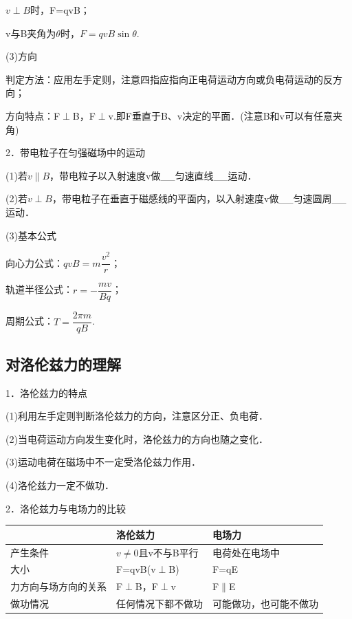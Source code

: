 \documentclass[cn,10.5pt,chinese,mac,chinesefont=founder]{elegantbook}
\begin{document}
$v\perp B$时，F=qvB；

v与B夹角为$\theta$时，$F=qvB\sin \theta$.

(3)方向

判定方法：应用左手定则，注意四指应指向正电荷运动方向或负电荷运动的反方向；

方向特点：F$\perp$B，F$\perp$v.即F垂直于B、v决定的平面．(注意B和v可以有任意夹角)

2．带电粒子在匀强磁场中的运动

(1)若$v\parallel B$，带电粒子以入射速度v做\_\_匀速直线\_\_运动．

(2)若$v\perp B$，带电粒子在垂直于磁感线的平面内，以入射速度v做\_\_匀速圆周\_\_运动．

(3)基本公式

向心力公式：$q v B=m \dfrac{v^{2}}{r}$；

轨道半径公式：$r=-\dfrac{m v}{B q}$；

周期公式：$T=\dfrac{2 \pi m}{q B}$.
\newpage
\subsection{对洛伦兹力的理解}

1．洛伦兹力的特点

(1)利用左手定则判断洛伦兹力的方向，注意区分正、负电荷．

(2)当电荷运动方向发生变化时，洛伦兹力的方向也随之变化．

(3)运动电荷在磁场中不一定受洛伦兹力作用．

(4)洛伦兹力一定不做功．

2．洛伦兹力与电场力的比较

\begin{longtable}[]{@{}m{4cm}m{4cm}m{4cm}@{}}
\toprule
& 洛伦兹力 & 电场力\tabularnewline
\midrule
\endhead
产生条件 & $v\neq 0$且v不与B平行 & 电荷处在电场中\tabularnewline
大小 & F=qvB(v$\perp$B) & F=qE\tabularnewline

力方向与场方向的关系
& \begin{minipage}[t]{0.30\columnwidth}\raggedright
F$\perp$B，F$\perp$v\strut
\end{minipage} & \begin{minipage}[t]{0.30\columnwidth}\raggedright
F$\parallel$E\strut
\end{minipage}\tabularnewline
做功情况 & 任何情况下都不做功 & 可能做功，也可能不做功\tabularnewline
\bottomrule
\end{longtable}
\end{document}
